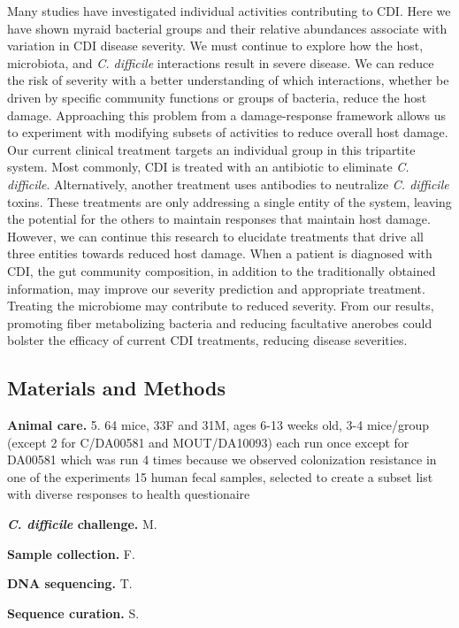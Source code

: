 \documentclass[
  12pt,
]{article}
\begin{document}
Many studies have investigated individual activities contributing to
CDI. Here we have shown myraid bacterial groups and their relative
abundances associate with variation in CDI disease severity. We must
continue to explore how the host, microbiota, and \emph{C. difficile}
interactions result in severe disease. We can reduce the risk of
severity with a better understanding of which interactions, whether be
driven by specific community functions or groups of bacteria, reduce the
host damage. Approaching this problem from a damage-response framework
allows us to experiment with modifying subsets of activities to reduce
overall host damage. Our current clinical treatment targets an
individual group in this tripartite system. Most commonly, CDI is
treated with an antibiotic to eliminate \emph{C. difficile}.
Alternatively, another treatment uses antibodies to neutralize \emph{C.
difficile} toxins. These treatments are only addressing a single entity
of the system, leaving the potential for the others to maintain
responses that maintain host damage. However, we can continue this
research to elucidate treatments that drive all three entities towards
reduced host damage. When a patient is diagnosed with CDI, the gut
community composition, in addition to the traditionally obtained
information, may improve our severity prediction and appropriate
treatment. Treating the microbiome may contribute to reduced severity.
From our results, promoting fiber metabolizing bacteria and reducing
facultative anerobes could bolster the efficacy of current CDI
treatments, reducing disease severities.

\hypertarget{materials-and-methods}{%
\subsection{Materials and Methods}\label{materials-and-methods}}

\textbf{Animal care.} 5. 64 mice, 33F and 31M, ages 6-13 weeks old, 3-4
mice/group (except 2 for C/DA00581 and MOUT/DA10093) each run once
except for DA00581 which was run 4 times because we observed
colonization resistance in one of the experiments 15 human fecal
samples, selected to create a subset list with diverse responses to
health questionaire

\textbf{\emph{C. difficile} challenge.} M.

\textbf{Sample collection.} F.

\textbf{DNA sequencing.} T.

\textbf{Sequence curation.} S.
\end{document}
